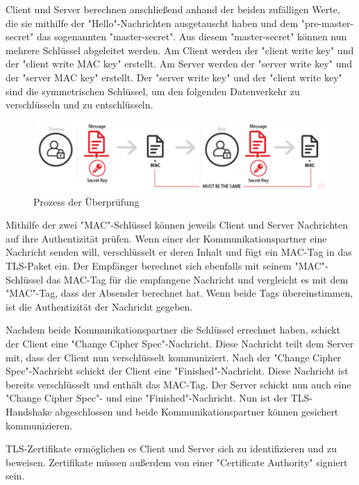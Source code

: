Client und Server berechnen anschließend anhand der beiden zufälligen Werte, die sie mithilfe der "Hello"-Nachrichten ausgetauscht haben und dem "pre-master-secret" das sogenannten "master-secret". Aus diesem "master-secret" können nun mehrere Schlüssel abgeleitet werden. Am Client werden der "client write key" und der "client write MAC key" erstellt. Am Server werden der "server write key" und der "server MAC key" erstellt. Der "server write key" und der "client write key" sind die symmetrischen Schlüssel, um den folgenden Datenverkehr zu verschlüsseln und zu entschlüsseln. \cite{WikiTLS}

\begin{figure}[H]
    \centering
    \includegraphics{media/OpenSSL/key.png}
    \caption{Prozess der Überprüfung \cite{TerminologyTLS}} 
\end{figure}

Mithilfe der zwei "MAC"-Schlüssel können jeweils Client und Server Nachrichten auf ihre Authentizität prüfen. Wenn einer der Kommunikationspartner eine Nachricht senden will, verschlüsselt er deren Inhalt und fügt ein MAC-Tag in das TLS-Paket ein. Der Empfänger berechnet sich ebenfalls mit seinem "MAC"-Schlüssel das MAC-Tag für die empfangene Nachricht und vergleicht es mit dem "MAC"-Tag, dass der Absender berechnet hat. Wenn beide Tags übereinstimmen, ist die Authentizität der Nachricht gegeben.

Nachdem beide Kommunikationspartner die Schlüssel errechnet haben, schickt der Client eine "Change Cipher Spec"-Nachricht. Diese Nachricht teilt dem Server mit, dass der Client nun verschlüsselt kommuniziert. Nach der "Change Cipher Spec"-Nachricht schickt der Client eine "Finished"-Nachricht. Diese Nachricht ist bereits verschlüsselt und enthält das MAC-Tag. Der Server schickt nun auch eine "Change Cipher Spec"- und eine "Finished"-Nachricht. Nun ist der TLS-Handshake abgeschlossen und beide Kommunikationspartner können gesichert kommunizieren. \cite{SessionKeyTLS}


TLS-Zertifikate ermöglichen es Client und Server sich zu identifizieren und zu beweisen. Zertifikate müssen außerdem von einer "Certificate Authority" signiert sein. 

